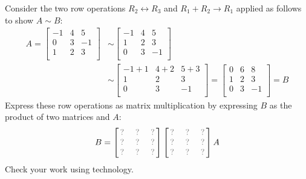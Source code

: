 \begin{activity}{10}
Consider the two row operations 
\(R_2\leftrightarrow R_3\) and \(R_1+R_2\to R_1\)
applied as follows to show \(A\sim B\):
\begin{align*}
A
  =
\begin{bmatrix}
-1&4&5\\
0&3&-1\\
1&2&3\\
\end{bmatrix}
  &\sim
\begin{bmatrix}
-1&4&5\\
1&2&3\\
0&3&-1\\
\end{bmatrix}
  \\&\sim
\begin{bmatrix}
-1+1&4+2&5+3\\
1&2&3\\
0&3&-1\\
\end{bmatrix}
  =
\begin{bmatrix}
0&6&8\\
1&2&3\\
0&3&-1\\
\end{bmatrix}
  = 
B
\end{align*}
Express these row operations as matrix multiplication
by expressing \(B\) as the product of two matrices and \(A\):
\[
B =
\begin{bmatrix}
\unknown&\unknown&\unknown\\
\unknown&\unknown&\unknown\\
\unknown&\unknown&\unknown
\end{bmatrix}
\begin{bmatrix}
\unknown&\unknown&\unknown\\
\unknown&\unknown&\unknown\\
\unknown&\unknown&\unknown
\end{bmatrix}
A
\]
Check your work using technology.
\end{activity}




